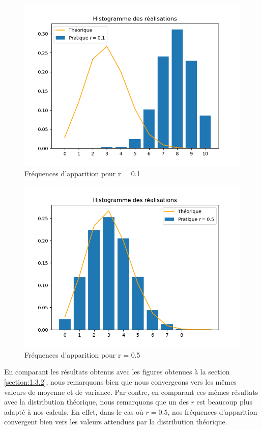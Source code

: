\begin{figure}[H]
  \centering
  \includegraphics[width=.6\textwidth]{figs/histo1.png}
  \caption{Fréquences d'apparition pour r = 0.1}
\end{figure}
\begin{figure}[H]
  \centering
  \includegraphics[width=.6\textwidth]{figs/histo2.png}
  \caption{Fréquences d'apparition pour r = 0.5}
\end{figure}

En comparant les résultats obtenus avec les figures obtenues à la section \ref{section:1.3.2}, nous remarquons bien que nous convergeons vers les mêmes valeurs de moyenne et de variance. Par contre, 
en comparant ces mêmes résultats avec la distribution théorique, nous remarquons que un des $r$ est beaucoup plus adapté à nos calculs. En effet, dans le cas où $r = 0.5$, nos fréquences d'apparition 
convergent bien vers les valeurs attendues par la distribution théorique.